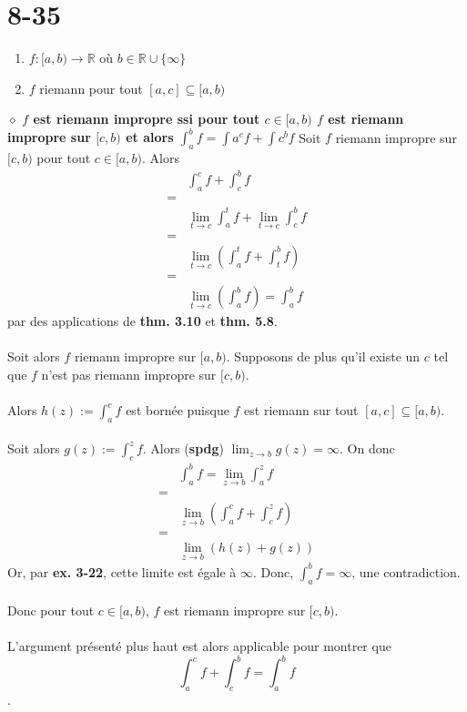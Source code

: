 \documentclass[a4paper,10pt]{article}
\begin{document}
\section*{8-35}
\begin{enumerate}
 \item $f:[a,b) \rightarrow \mathbb{R}$ où $b \in \mathbb{R} \cup \{\infty\}$
 \item $f$ riemann pour tout $[a,c] \subseteq [a,b)$
\end{enumerate}
$\diamond$ \textbf{$f$ est riemann impropre ssi pour tout $c \in [a,b)$ $f$ est riemann impropre sur $[c,b)$ et alors 
$\int_a^b f = \int a^c f + \int c^b f$}
Soit $f$ riemann impropre sur $[c,b)$ pour tout $c \in [a,b)$. Alors
\begin{align*}
 & \int_a^c f + \int_c^b f \\
 = \\
 & \lim_{t \to c} \int_a^t f + \lim_{t \to c} \int_c^b f \\
 = \\
 & \lim_{t \to c}(\int_a^t f + \int_t^b f) \\
 = \\
 & \lim_{t \to c}(\int_a^b f) = \int_a^b f
\end{align*}
par des applications de \textbf{thm. 3.10} et \textbf{thm. 5.8}.
\\
\\
Soit alors $f$ riemann impropre sur $[a,b)$. Supposons de plus qu'il existe un $c$ tel que 
$f$ n'est pas riemann impropre sur $[c,b)$. 
\\
\\
Alors $h(z) := \int_a^c f$ est bornée puisque $f$ est riemann sur tout $[a,c] \subseteq [a,b)$. 
\\
\\
Soit alors $g(z) := \int_c^z f$. Alors (\textbf{spdg}) $\lim_{z \to b} g(z) = \infty$. On donc
\begin{align*}
 & \int_a^b f = \lim_{z \to b} \int_a^z f \\
 = \\
 & \lim_{z \to b} (\int_a^c f + \int_c^z f) \\
 = \\
 & \lim_{z \to b}(h(z) + g(z))
\end{align*}
Or, par \textbf{ex. 3-22}, cette limite est égale à $\infty$. Donc, $\int_a^b f = \infty$, une contradiction.
\\
\\
Donc pour tout $c \in [a,b)$, $f$ est riemann impropre sur $[c,b)$. 
\\
\\
L'argument présenté plus haut est alors applicable pour montrer que $$\int_a^c f + \int_c^b f = \int_a^b f$$.
\end{document}
